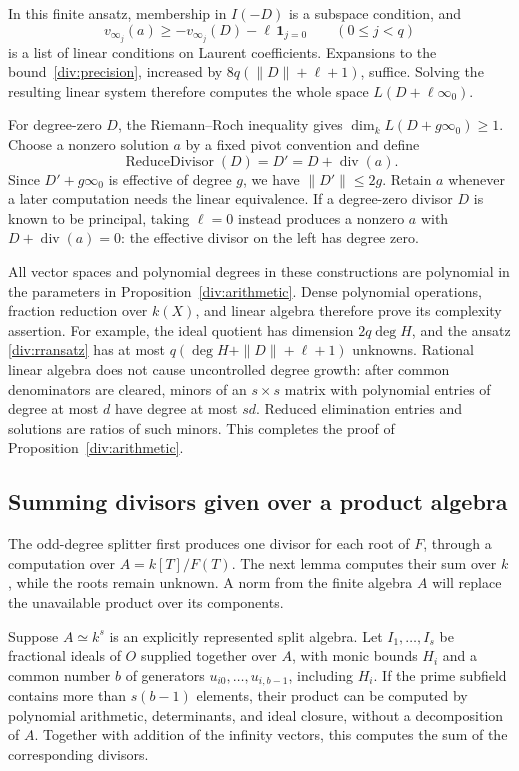 In this finite ansatz, membership in $I(-D)$ is a subspace condition, and
\[
 v_{\infty_j}(a)\geq-v_{\infty_j}(D)-\ell\,\mathbf1_{j=0}
 \qquad(0\leq j<q)
\]
is a list of linear conditions on Laurent coefficients.  Expansions to
the bound~\eqref{div:precision}, increased by
$8q(\|D\|+\ell+1)$, suffice.  Solving the resulting linear system
therefore computes the whole space $L(D+\ell\infty_0)$.

For degree-zero $D$, the Riemann--Roch inequality
\cite[Tag~0BS6]{StacksProject} gives
$\dim_kL(D+g\infty_0)\geq1$.  Choose a nonzero solution $a$ by a fixed
pivot convention and define
\begin{equation}\label{div:reduce}
 \operatorname{ReduceDivisor}(D)=D'=D+\operatorname{div}(a).
\end{equation}
Since $D'+g\infty_0$ is effective of degree $g$, we have
$\|D'\|\leq2g$.  Retain $a$ whenever a later computation needs the
linear equivalence.  If a degree-zero divisor $D$ is known to be
principal, taking $\ell=0$ instead produces a nonzero $a$ with
$D+\operatorname{div}(a)=0$: the effective divisor on the left has degree
zero.

All vector spaces and polynomial degrees in these constructions are
polynomial in the parameters in Proposition~\ref{div:arithmetic}.
Dense polynomial operations, fraction reduction over $k(X)$, and linear
algebra therefore prove its complexity assertion.  For example, the
ideal quotient has dimension $2q\deg H$, and the ansatz
\eqref{div:rransatz} has at most
$q(\deg H+\|D\|+\ell+1)$ unknowns.  Rational linear algebra does not
cause uncontrolled degree growth: after common denominators are cleared,
minors of an $s\times s$ matrix with polynomial entries of degree at
most $d$ have degree at most $sd$.  Reduced elimination entries and
solutions are ratios of such minors.  This completes the proof of
Proposition~\ref{div:arithmetic}.

\subsection{Summing divisors given over a product algebra}

The odd-degree splitter first produces one divisor for each root of $F$,
through a computation over $A=k[T]/F(T)$.  The next lemma computes their
sum over $k$, while the roots remain unknown.  A norm from the finite
algebra $A$ will replace the unavailable product over its components.

\begin{lemma}\label{div:trace}
Suppose $A\simeq k^s$ is an explicitly represented split algebra.  Let
$I_1,\ldots,I_s$ be fractional ideals of $O$ supplied together over $A$,
with monic bounds $H_i$ and a common number $b$ of generators
$u_{i0},\ldots,u_{i,b-1}$, including $H_i$.  If the prime subfield
contains more than $s(b-1)$ elements, their product can be computed by
polynomial arithmetic, determinants, and ideal closure, without a
decomposition of $A$.  Together with addition of the infinity vectors,
this computes the sum of the corresponding divisors.
\end{lemma}

